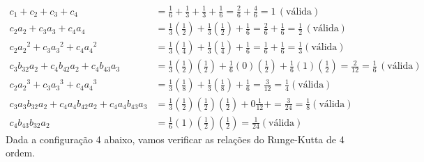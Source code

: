 \documentclass[a4paper,12pt]{article}
\begin{document}
\begin{align*}
	c_1 + c_2 + c_3 + c_4 &= \frac{1}{6} + \frac{1}{3} + \frac{1}{3} + \frac{1}{6}= \frac{2}{6} +
	\frac{4}{6}=  1\hspace{2pt}(\textrm{v\'alida}) \\
	c_2 a_2 + c_3 a_3  + c_4 a_4&= \frac{1}{3}\left (\frac{1}{2} \right ) + \frac{1}{3} \left
	(\frac{1}{2}\right ) +\frac{1}{6} = \frac{2}{6} +\frac{1}{6} =\frac{1}{2} \hspace{2pt}(\textrm{v\'alida})\\
	c_2 {a_2}^{2} + c_3 {a_3}^{2} + c_4 {a_4}^{2}&=  \frac{1}{3}\left (\frac{1}{4}\right ) + \frac{1}{3}\left
	(\frac{1}{4}\right ) + \frac{1}{6} = \frac{1}{6} + \frac{1}{6}= \frac{1}{3} (\textrm{v\'alida})\\
	c_3 b_{32} a_2 + c_4 b_{42}a_2  + c_4 b_{43} a_3 &= \frac{1}{3} \left  (\frac{1}{2}\right ) \left
	(\frac{1}{2}\right ) + \frac{1}{6} (0)\left (\frac{1}{2}\right ) + \frac{1}{6}(1)\left (\frac{1}{2}\right )  =
	\frac{2}{12}=\frac{1}{6}\hspace{2pt}(\textrm{v\'alida})\\
	c_2 {a_2}^{3} + c_3 {a_3}^{3} + c_4 {a_4}^{3}&= \frac{1}{3} \left (\frac{1}{8}\right ) + \frac{1}{3}\left
	( \frac{1}{8}\right )  + \frac{1}{6} =  \frac{3}{12}=\frac{1}{4}(\textrm{v\'alida}) \\
	c_3 a_3 b_{32} a_2 + c_4 a_4 b_{42}a_2  + c_4 a_4 b_{43} a_3 &=  \frac{1}{3}\left (\frac{1}{2}\right)\left
	(\frac{1}{2}\right)\left (\frac{1}{2}\right) + 0  \frac{1}{12} + = \frac{3}{24} = \frac{1}{8}(\textrm{v\'alida})\\
	c_4 b_{43} b_{32} a_2 &=  \frac{1}{6} (1)\left (\frac{1}{2} \right )\left (\frac{1}{2} \right ) = \frac{1}{24}(\textrm{v\'alida})
\end{align*}
Dada a configura\c c\~ao 4 abaixo, vamos verificar as rela\c c\~oes do Runge-Kutta de 4 ordem.
\end{document}

